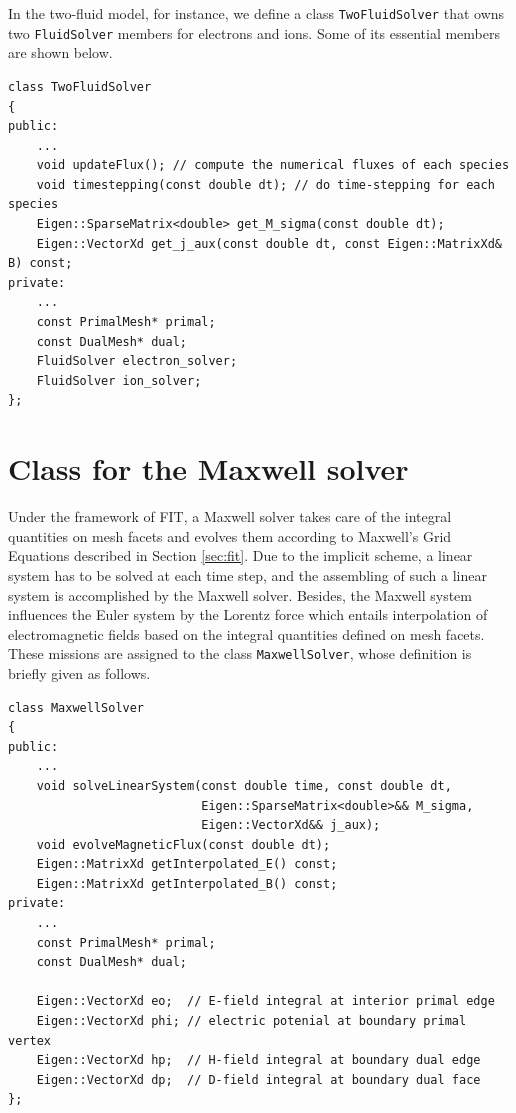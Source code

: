 \documentclass{report}
\begin{document}
\begin{appendices}
In the two-fluid model, for instance, we define a class \texttt{TwoFluidSolver} that owns two \texttt{FluidSolver} members for electrons and ions. Some of its essential members are shown below.
\begin{lstlisting}[numbers=none]
class TwoFluidSolver
{
public:
    ...
    void updateFlux(); // compute the numerical fluxes of each species 
    void timestepping(const double dt); // do time-stepping for each species
    Eigen::SparseMatrix<double> get_M_sigma(const double dt); 
    Eigen::VectorXd get_j_aux(const double dt, const Eigen::MatrixXd& B) const; 
private:
    ...
    const PrimalMesh* primal;
    const DualMesh* dual;
    FluidSolver electron_solver;
    FluidSolver ion_solver;
};
\end{lstlisting}

\section{Class for the Maxwell solver}
Under the framework of FIT, a Maxwell solver takes care of the integral quantities on mesh facets and evolves them according to Maxwell's Grid Equations described in Section \ref{sec:fit}. Due to the implicit scheme, a linear system has to be solved at each time step, and the assembling of such a linear system is accomplished by the Maxwell solver. Besides, the Maxwell system influences the Euler system by the Lorentz force which entails interpolation of electromagnetic fields based on the integral quantities defined on mesh facets. These missions are assigned to the class \texttt{MaxwellSolver}, whose definition is briefly given as follows.
\begin{lstlisting}[numbers=none]
class MaxwellSolver
{
public:
    ...
    void solveLinearSystem(const double time, const double dt,
                           Eigen::SparseMatrix<double>&& M_sigma, 
                           Eigen::VectorXd&& j_aux);
    void evolveMagneticFlux(const double dt);
    Eigen::MatrixXd getInterpolated_E() const;
    Eigen::MatrixXd getInterpolated_B() const; 
private:
    ...
    const PrimalMesh* primal;
    const DualMesh* dual;
    
    Eigen::VectorXd eo;  // E-field integral at interior primal edge
    Eigen::VectorXd phi; // electric potenial at boundary primal vertex
    Eigen::VectorXd hp;	 // H-field integral at boundary dual edge  
    Eigen::VectorXd dp;	 // D-field integral at boundary dual face
};
\end{lstlisting}


\end{appendices}
\end{document}
